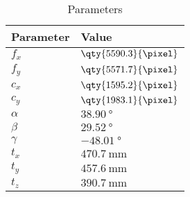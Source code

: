 \begin{table}[H]
    \centering
    \caption{Parameters}
    \begin{tabular}{| C{0.15\textwidth} | C{0.30\textwidth} |}
        \hline
        Parameter & Value                   \\
        \hline
        \hline
        $f_x$     & $\qty{5590.3}{\pixel}$ \\
        $f_y$     & $\qty{5571.7}{\pixel}$ \\
        \hline
        $c_x$     & $\qty{1595.2}{\pixel}$ \\
        $c_y$     & $\qty{1983.1}{\pixel}$ \\
        \hline
        $\alpha$  & $\qty{38.90}{\degree}$  \\
        $\beta$   & $\qty{29.52}{\degree}$  \\
        $\gamma$  & $\qty{-48.01}{\degree}$ \\
        \hline
        $t_x$     & $\qty{470.7}{\mm}$     \\
        $t_y$     & $\qty{457.6}{\mm}$     \\
        $t_z$     & $\qty{390.7}{\mm}$     \\
        \hline
    \end{tabular}
\end{table}
